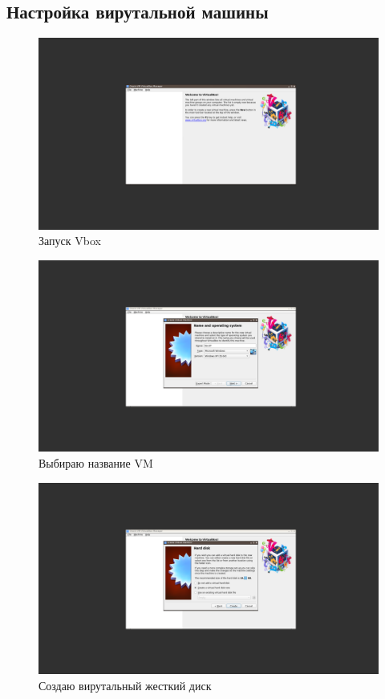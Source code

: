 \documentclass[a4paper]{article}
\begin{document}
\subsection{Настройка вирутальной машины}

\begin{figure}[H]
    \centering
    \includegraphics[width=\linewidth]{1.png}
    \caption{Запуск Vbox}
\end{figure}

\begin{figure}[H]
    \centering
    \includegraphics[width=\linewidth]{2.png}
    \caption{Выбираю название VM}
\end{figure}

\begin{figure}[H]
    \centering
    \includegraphics[width=\linewidth]{3.png}
    \caption{Создаю вирутальный жесткий диск}
\end{figure}
\end{document}
